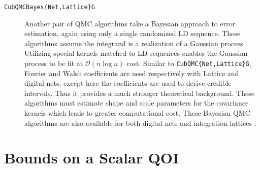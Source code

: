 \documentclass[graybox]{svmult}
\begin{document}
\begin{description}
    \item[\texttt{CubQMCBayes\{Net,Lattice\}G}] Another pair of QMC algorithms take a Bayesian approach to error estimation, again using only a single randomized LD sequence. These algorithms assume the integrand is a realization of a Gaussian process. Utilizing special kernels matched to LD sequences enables the Gaussian process to be fit at $\mathcal{O}(n \log n)$ cost. Similar to \texttt{CubQMC\{Net,Lattice\}G}, Fourier and Walsh coefficients are used respectively with Lattice and digital nets, except here the coefficients are used to derive credible intervals. Thus it provides a much stronger theoretical background. These algorithms must estimate shape and scale parameters for the covariance kernels which leads to greater computational cost. These Bayesian QMC algorithms \cite{cubqmcbayes_thesis} are also available for both digital nets \cite{cubqmcbayessobol} and integration lattices  \cite{cubqmcbayeslattice}. 
\end{description}


\section{Bounds on a Scalar QOI} \label{SoRa_sec:comb_sol_approx}
\end{document}
